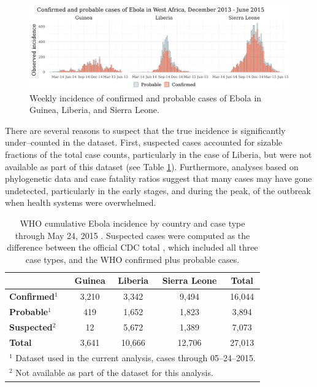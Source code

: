 \begin{figure}[htbp]
	\centering
	\includegraphics[width=\linewidth]{figures/ebola_dat}
	\caption{Weekly incidence of confirmed and probable cases of Ebola in Guinea, Liberia, and Sierra Leone.}
	\label{fig:eboladat}
\end{figure}

There are several reasons to suspect that the true incidence is significantly under--counted in the dataset. First, suspected cases accounted for sizable fractions of the total case counts, particularly in the case of Liberia, but were not available as part of this dataset (see Table \ref{tab:ebola_descriptives}). Furthermore, analyses based on phylogenetic data \cite{scarpino2014epidemiological} and case fatality ratios \cite{atkins2015under,garske2017heterogeneities} suggest that many cases may have gone undetected, particularly in the early stages, and during the peak, of the outbreak when health systems were overwhelmed. 

\begin{table}[htbp]
	\caption{WHO cumulative Ebola incidence by country and case type through May 24, 2015 \cite{who2016eboladat}. Suspected cases were computed as the difference between the official CDC total \cite{cdc2016eboladat}, which included all three case types, and the WHO confirmed plus probable cases.}
	\label{tab:ebola_descriptives}
	\small
	\centering
	\begin{tabular}{lcccc}	
		\hline	
		& \textbf{Guinea} & \textbf{Liberia} & \textbf{Sierra Leone} & \textbf{Total} \\\hline
		\textbf{Confirmed}$ ^1 $ & 3,210 & 3,342 & 9,494 & 16,044\\ 
		\textbf{Probable}$ ^1 $ & 419 & 1,652 & 1,823 & 3,894 \\
		\textbf{Suspected$ ^2 $} & 12 & 5,672 & 1,389 & 7,073 \\
		\hline
		\textbf{Total} & 3,641 & 10,666 & 12,706 & 27,013 \\
		\hline
		\multicolumn{5}{l}{\scriptsize $ ^1 $ Dataset used in the current analysis, cases through 05--24--2015.}\\
		\multicolumn{5}{l}{\scriptsize $ ^2 $ Not available as part of the dataset for this analysis.}\\
	\end{tabular} 
\end{table}

